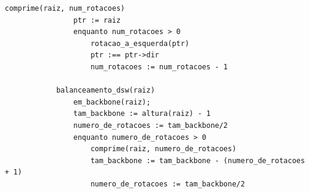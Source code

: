 
\begin{frame}[fragile,label=notas]
	\begin{center}\begin{minipage}{.85\textwidth}
		\begin{lstlisting}[morekeywords={balanceamento_dsw,em_backbone,altura,comprime,num_rotacoes}]
			comprime(raiz, num_rotacoes)
			    ptr := raiz
			    enquanto num_rotacoes > 0
			        rotacao_a_esquerda(ptr)
			        ptr :== ptr->dir
			        num_rotacoes := num_rotacoes - 1

			balanceamento_dsw(raiz)
			    em_backbone(raiz);
			    tam_backbone := altura(raiz) - 1
			    numero_de_rotacoes := tam_backbone/2
			    enquanto numero_de_rotacoes > 0
			        comprime(raiz, numero_de_rotacoes)
			        tam_backbone := tam_backbone - (numero_de_rotacoes + 1)
			        numero_de_rotacoes := tam_backbone/2
		\end{lstlisting}
		 	    
	\end{minipage}\end{center}
\end{frame}

